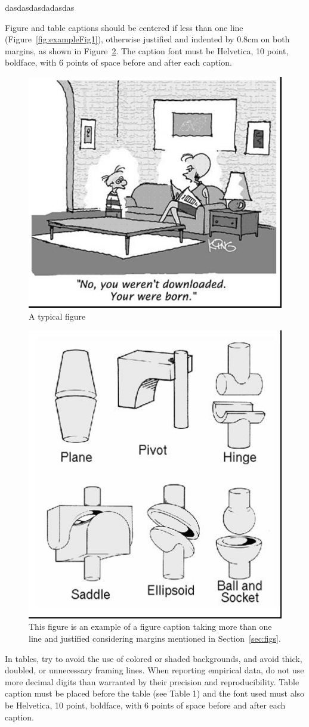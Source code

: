 \documentclass[12pt]{article}
\begin{document}
dasdasdasdadasdas


Figure and table captions should be centered if less than one line
(Figure~\ref{fig:exampleFig1}), otherwise justified and indented by 0.8cm on
both margins, as shown in Figure~\ref{fig:exampleFig2}. The caption font must
be Helvetica, 10 point, boldface, with 6 points of space before and after each
caption.

\begin{figure}[ht]
\centering
\includegraphics[width=.5\textwidth]{fig1.jpg}
\caption{A typical figure}
\label{fig:fig}
\end{figure}

\begin{figure}[ht]
\centering
\includegraphics[width=.3\textwidth]{fig2.jpg}
\caption{This figure is an example of a figure caption taking more than one
  line and justified considering margins mentioned in Section~\ref{sec:figs}.}
\label{fig:exampleFig2}
\end{figure}

In tables, try to avoid the use of colored or shaded backgrounds, and avoid
thick, doubled, or unnecessary framing lines. When reporting empirical data,
do not use more decimal digits than warranted by their precision and
reproducibility. Table caption must be placed before the table (see Table 1)
and the font used must also be Helvetica, 10 point, boldface, with 6 points of
space before and after each caption.
\end{document}
